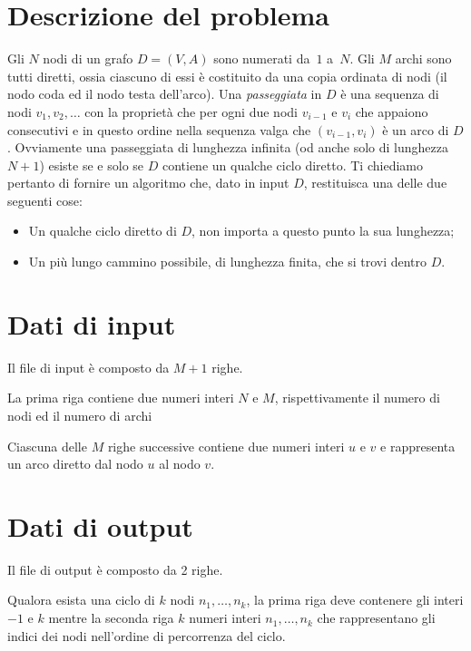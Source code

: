 \documentclass[a4paper,11pt]{article}
\begin{document}

\section*{Descrizione del problema}

Gli $N$ nodi di un grafo $D=(V,A)$ sono numerati da~$1$ a~$N$.
Gli $M$ archi sono tutti diretti, ossia ciascuno di essi è costituito da una copia ordinata di nodi (il nodo coda ed il nodo testa dell'arco).
Una \emph{passeggiata} in $D$ è una sequenza di nodi $v_1, v_2, \ldots$
con la proprietà che per ogni due nodi $v_{i-1}$ e $v_i$ che appaiono consecutivi e in questo ordine nella sequenza valga che $(v_{i-1},v_i)$ è un arco di $D$.
    Ovviamente una passeggiata di lunghezza infinita (od anche solo di lunghezza $N+1$) esiste se e solo se
    $D$ contiene un qualche ciclo diretto.
    Ti chiediamo pertanto di fornire un algoritmo che,
    dato in input $D$,
    restituisca una delle due seguenti cose:
    \begin{itemize}
        \item Un qualche ciclo diretto di $D$, non importa a questo punto la sua lunghezza;
        \item Un più lungo cammino possibile, di lunghezza finita,
              che si trovi dentro $D$.
    \end{itemize}

\section*{Dati di input}

      Il file di input è composto da $M+1$ righe.

      La prima riga contiene due numeri interi $N$ e $M$,
      rispettivamente il numero di nodi ed il numero di archi

      Ciascuna delle $M$ righe successive contiene due numeri interi
      $u$ e $v$ e rappresenta un arco diretto dal nodo $u$ al nodo $v$.

\section*{Dati di output}

      Il file di output è composto da 2 righe.

      Qualora esista una ciclo di $k$ nodi $n_{1}, \ldots, n_{k}$,
      la prima riga deve contenere gli interi $-1$ e $k$
      mentre la seconda riga $k$ numeri interi $n_{1}, \ldots, n_{k}$
      che rappresentano gli indici dei nodi nell'ordine di percorrenza del ciclo.
\end{document}

